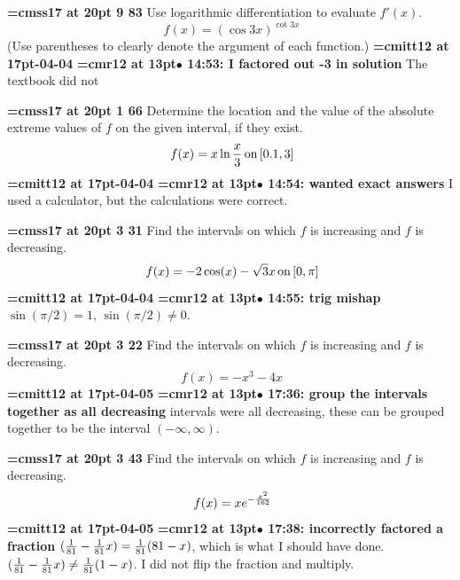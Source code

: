 {\medskip\noindent\bf\font\titlefont=cmss17 at 20pt 9 83}\medskip
Use logarithmic differentiation to evaluate $f'(x)$.
$$\
f(x) = (\cos 3x)^{\cot 3x}
$$
(Use parentheses to clearly denote the argument of each function.)
{\medskip\noindent\bf\font\titlefont=cmitt12 at 17pt\titlefont 2026-04-04}\medskip
{\smallskip\noindent\bf\font\titlefont=cmr12 at 13pt\titlefont $\bullet$ 14:53: I factored out -3 in solution}\smallskip
The textbook did not
\par

{\medskip\noindent\bf\font\titlefont=cmss17 at 20pt 1 66}\medskip
Determine the location and the value of the absolute extreme
values of $f$ on the given interval, if they exist.
$$\
f(x) = x\ln{x \over 3} \, \hbox{on} \, [0.1, 3]
$$
{\medskip\noindent\bf\font\titlefont=cmitt12 at 17pt-04-04}\medskip
{\smallskip\noindent\bf\font\titlefont=cmr12 at 13pt\titlefont $\bullet$ 14:54: wanted exact answers}\smallskip
I used a calculator, but the calculations were correct.
\par

{\medskip\noindent\bf\font\titlefont=cmss17 at 20pt 3 31}\medskip
Find the intervals on which $f$ is increasing and $f$ is decreasing.
$$\
f(x) = -2 \cos (x) - \sqrt{3} x \, \hbox{on} \, [0, \pi]
$$
{\medskip\noindent\bf\font\titlefont=cmitt12 at 17pt-04-04}\medskip
{\smallskip\noindent\bf\font\titlefont=cmr12 at 13pt\titlefont $\bullet$ 14:55: trig mishap}\smallskip
$\sin(\pi / 2) = 1$, $\sin(\pi / 2) \ne 0$.
\par

{\medskip\noindent\bf\font\titlefont=cmss17 at 20pt 3 22}\medskip
Find the intervals on which $f$ is increasing and $f$ is decreasing.
$$\
f(x) = -x^3 - 4x
$$
{\medskip\noindent\bf\font\titlefont=cmitt12 at 17pt\titlefont 2026-04-05}\medskip
{\smallskip\noindent\bf\font\titlefont=cmr12 at 13pt\titlefont $\bullet$ 17:36: group the intervals together as all decreasing}\smallskip
3 intervals were all decreasing, these can be grouped together to be the interval $(-\infty, \infty)$.
\par

\xrdef{node118}
{\medskip\noindent\bf\font\titlefont=cmss17 at 20pt\titlefont 4 3 43}\medskip
Find the intervals on which $f$ is increasing and $f$ is decreasing.
$$\
f(x) = xe^{-{x^2 \over 162}}
$$
{\medskip\noindent\bf\font\titlefont=cmitt12 at 17pt\titlefont 2026-04-05}\medskip
{\smallskip\noindent\bf\font\titlefont=cmr12 at 13pt\titlefont $\bullet$ 17:38: incorrectly factored a fraction}\smallskip
$({1 \over 81} - {1 \over 81}x) = {1 \over 81} (81 - x)$, which is what I should have done. $({1 \over 81} - {1 \over 81}x) \ne {1 \over 81}(1 - x)$. I did not flip the fraction and multiply.
\par

